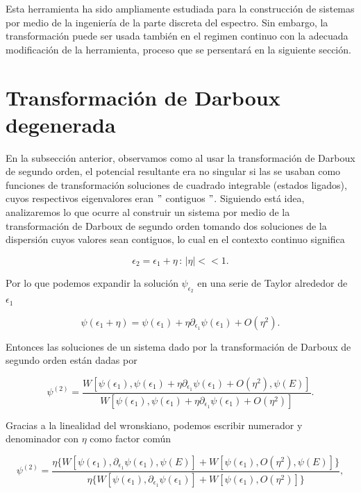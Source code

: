 Esta herramienta ha sido ampliamente estudiada para la construcción de sistemas por medio de la ingeniería de la parte discreta del espectro. Sin embargo, la transformación puede ser usada también en el regimen continuo con la adecuada modificación de la herramienta, proceso que se persentará en la siguiente sección.

\section{Transformación de Darboux degenerada}

En la subsección anterior, observamos como al usar la transformación de Darboux de segundo orden, el potencial resultante era no singular si las se usaban como funciones de transformación soluciones de cuadrado integrable (estados ligados), cuyos respectivos eigenvalores eran $"$ contiguos $"$. Siguiendo está idea, analizaremos lo que ocurre al construir un sistema por medio de la transformación de Darboux de segundo orden tomando dos soluciones de la dispersión cuyos valores sean contiguos, lo cual en el contexto continuo significa

\begin{equation*}
	\epsilon_2 = \epsilon_1 + \eta \,:\, |\eta|<<1.
\end{equation*}

Por lo que podemos expandir la solución $\psi_{\epsilon_2}$ en una serie de Taylor alrededor de $\epsilon_1$

\begin{equation*}
\psi(\epsilon_1 + \eta) = \psi(\epsilon_1) + \eta \partial_{\epsilon_1} \psi(\epsilon_1) + O(\eta^2).
\end{equation*}

Entonces las soluciones de un sistema dado por la transformación de Darboux de segundo orden están dadas por

\begin{equation*}
	\psi^{(2)} = \frac{W[\psi(\epsilon_1),\psi(\epsilon_1) + \eta \partial_{\epsilon_1} \psi(\epsilon_1) + O(\eta^2),\psi(E)]}{W[\psi(\epsilon_1),\psi(\epsilon_1) + \eta \partial_{\epsilon_1} \psi(\epsilon_1) + O(\eta^2)]}.
\end{equation*}

Gracias a la linealidad del wronskiano, podemos escribir numerador y denominador con $\eta$ como factor común

\begin{equation*}
\psi^{(2)} = \frac{\eta \{W[\psi(\epsilon_1), \partial_{\epsilon_1} \psi(\epsilon_1),\psi(E)] + W[\psi(\epsilon_1), O(\eta^2),\psi(E)]\}}{\eta\{W[\psi(\epsilon_1), \partial_{\epsilon_1} \psi(\epsilon_1)] + W[\psi(\epsilon_1), O(\eta^2)]\}},
\end{equation*}


